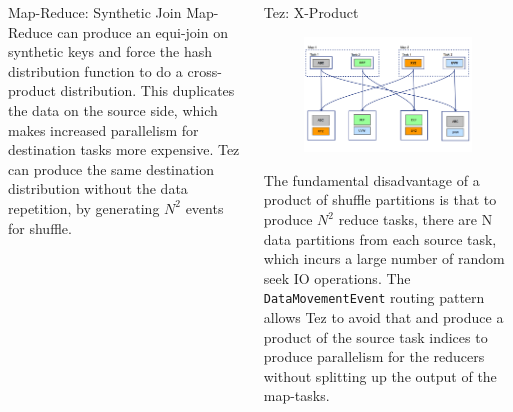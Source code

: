 \documentclass[final]{beamer}
\newlength{\onecolwid}
\newlength{\twocolwid}
\begin{document}
\begin{frame}[t]
\begin{columns}[t]
\begin{column}{\twocolwid}
\begin{columns}[t,totalwidth=\twocolwid]
\begin{column}{\onecolwid}
\begin{block}{Map-Reduce: Synthetic Join}
Map-Reduce can produce an equi-join on synthetic keys and force the hash distribution
function to do a cross-product distribution. This duplicates the data on the 
source side, which makes increased parallelism for destination tasks more expensive.
Tez can produce the same destination distribution without the data repetition, by generating 
${N}^2$ events for shuffle.

\end{block}


\end{column} %

\begin{column}{\onecolwid} %


\begin{block}{Tez: X-Product}


\begin{figure}
\includegraphics{figures/Tez-XProd-1.png}
\end{figure}

The fundamental disadvantage of a product of shuffle partitions is that to produce ${N}^2$ reduce tasks,
there are N data partitions from each source task, which incurs a large number of random seek IO operations.
The \texttt{DataMovementEvent} routing pattern allows Tez to avoid that and produce a product of the source
task indices to produce parallelism for the reducers without splitting up the output of the map-tasks.


\end{block}
\end{column}
\end{columns}
\end{column}
\end{columns}
\end{frame}
\end{document}
